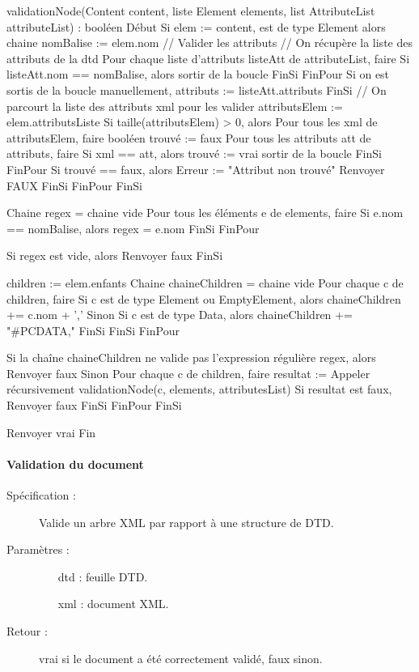 \documentclass[10pt,a4paper]{article}
\begin{document}
\begin{verbatimtab}
validationNode(Content content, liste Element elements, list AttributeList attributeList) : booléen
Début
Si elem := content, est de type Element alors
	chaine nomBalise := elem.nom
	// Valider les attributs
	// On récupère la liste des attributs de la dtd
	Pour chaque liste d'attributs listeAtt de attributeList, faire
		Si listeAtt.nom == nomBalise, alors
			sortir de la boucle
		FinSi
	FinPour	
	Si on est sortis de la boucle manuellement,
		attributs := listeAtt.attributs
	FinSi
	// On parcourt la liste des attributs xml pour les valider
	attributsElem := elem.attributsListe
	Si taille(attributsElem) > 0, alors
		Pour tous les xml de attributsElem, faire
			booléen trouvé := faux
			Pour tous les attributs att de attributs, faire
				Si xml == att, alors
					trouvé := vrai
					sortir de la boucle
				FinSi
			FinPour
			Si trouvé == faux, alors
				Erreur := "Attribut non trouvé"
				Renvoyer FAUX
			FinSi
		FinPour
	FinSi
		
	Chaine regex = chaine vide
	Pour tous les éléments e de elements, faire
		Si e.nom == nomBalise, alors
			regex = e.nom
		FinSi
	FinPour
		
	Si regex est vide, alors
		Renvoyer faux
	FinSi
		
	children := elem.enfants
	Chaine chaineChildren = chaine vide
	Pour chaque c de children, faire
		Si c est de type Element ou EmptyElement, alors
			chaineChildren += c.nom + ','
		Sinon
			Si c est de type Data, alors
				chaineChildren += "#PCDATA,"
			FinSi
		FinSi
	FinPour

	Si la chaîne chaineChildren ne valide pas l'expression régulière regex, alors
		Renvoyer faux
    	Sinon
    		Pour chaque c de children, faire
    			resultat := Appeler récursivement validationNode(c, elements, attributesList)
    			Si resultat est faux,
    				Renvoyer faux
    			FinSi
    		FinPour
    	FinSi
    	
    	Renvoyer vrai
Fin
\end{verbatimtab}

\paragraph{Validation du document}
\begin{description}
\item[Spécification :] Valide un arbre XML par rapport à une structure de DTD.
\item[Paramètres :]
\begin{itemize}
\item[dtd] : feuille DTD.
\item[xml] : document XML.
\end{itemize}
\item[Retour :] vrai si le document a été correctement validé, faux sinon.
\end{description}
\end{document}
